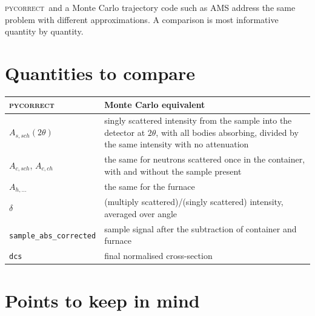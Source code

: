 \documentclass[11pt,a4paper]{report}
\newcommand{\code}[1]{\texttt{#1}}
\newcommand{\pyc}{\textsc{pycorrect}}
\begin{document}
\pyc\ and a Monte Carlo trajectory code such as AMS address the same problem with
different approximations. A comparison is most informative quantity by quantity.

\section{Quantities to compare}

\begin{center}
\begin{tabularx}{\linewidth}{@{}lX@{}}
\toprule
\pyc & Monte Carlo equivalent \\
\midrule
$A_{s,sch}(2\theta)$ & singly scattered intensity from the sample into the detector at $2\theta$, with all bodies absorbing, divided by the same intensity with no attenuation \\
$A_{c,sch}$, $A_{c,ch}$ & the same for neutrons scattered once in the container, with and without the sample present \\
$A_{h,\ldots}$ & the same for the furnace \\
$\delta$ & (multiply scattered)/(singly scattered) intensity, averaged over angle \\
\code{sample\_abs\_corrected} & sample signal after the subtraction of container and furnace \\
\code{dcs} & final normalised cross-section \\
\bottomrule
\end{tabularx}
\end{center}

\section{Points to keep in mind}
\end{document}
